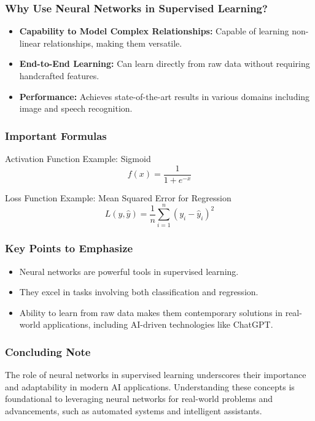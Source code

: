 \documentclass[aspectratio=169]{beamer}
\begin{document}
\begin{frame}[fragile]
    \frametitle{Why Use Neural Networks in Supervised Learning?}
    \begin{itemize}
        \item \textbf{Capability to Model Complex Relationships:} Capable of learning non-linear relationships, making them versatile.
        \item \textbf{End-to-End Learning:} Can learn directly from raw data without requiring handcrafted features.
        \item \textbf{Performance:} Achieves state-of-the-art results in various domains including image and speech recognition.
    \end{itemize}
\end{frame}

\begin{frame}[fragile]
    \frametitle{Important Formulas}
    \begin{block}{Activation Function}
        Example: Sigmoid
        \begin{equation}
            f(x) = \frac{1}{1 + e^{-x}}
        \end{equation}
    \end{block}
    
    \begin{block}{Loss Function}
        Example: Mean Squared Error for Regression
        \begin{equation}
            L(y, \hat{y}) = \frac{1}{n} \sum_{i=1}^{n} (y_i - \hat{y}_i)^2
        \end{equation}
    \end{block}
\end{frame}

\begin{frame}[fragile]
    \frametitle{Key Points to Emphasize}
    \begin{itemize}
        \item Neural networks are powerful tools in supervised learning.
        \item They excel in tasks involving both classification and regression.
        \item Ability to learn from raw data makes them contemporary solutions in real-world applications, including AI-driven technologies like ChatGPT.
    \end{itemize}
\end{frame}

\begin{frame}[fragile]
    \frametitle{Concluding Note}
    The role of neural networks in supervised learning underscores their importance and adaptability in modern AI applications. Understanding these concepts is foundational to leveraging neural networks for real-world problems and advancements, such as automated systems and intelligent assistants.
\end{frame}
\end{document}
